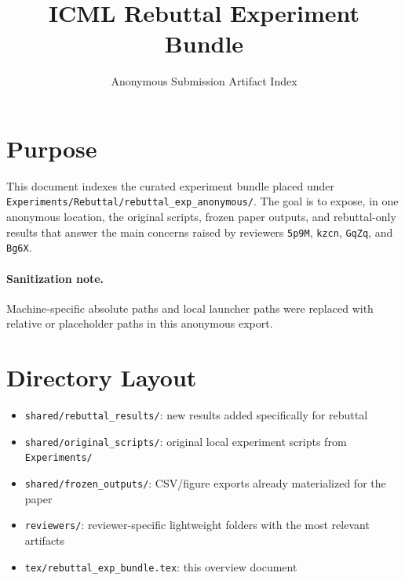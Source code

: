 \documentclass[11pt]{article}
\title{ICML Rebuttal Experiment Bundle}
\author{Anonymous Submission Artifact Index}
\date{}
\begin{document}
\maketitle

\section*{Purpose}
This document indexes the curated experiment bundle placed under
\texttt{Experiments/Rebuttal/rebuttal\_exp\_anonymous/}. The goal is to expose, in one anonymous location,
the original scripts, frozen paper outputs, and rebuttal-only results that answer the main concerns
raised by reviewers \texttt{5p9M}, \texttt{kzcn}, \texttt{GqZq}, and \texttt{Bg6X}.

\paragraph{Sanitization note.}
Machine-specific absolute paths and local launcher paths were replaced with relative or placeholder paths in this anonymous export.

\section*{Directory Layout}
\begin{itemize}[leftmargin=1.5em]
\item \texttt{shared/rebuttal\_results/}: new results added specifically for rebuttal
\item \texttt{shared/original\_scripts/}: original local experiment scripts from \texttt{Experiments/}
\item \texttt{shared/frozen\_outputs/}: CSV/figure exports already materialized for the paper
\item \texttt{reviewers/}: reviewer-specific lightweight folders with the most relevant artifacts
\item \texttt{tex/rebuttal\_exp\_bundle.tex}: this overview document
\end{itemize}
\end{document}
